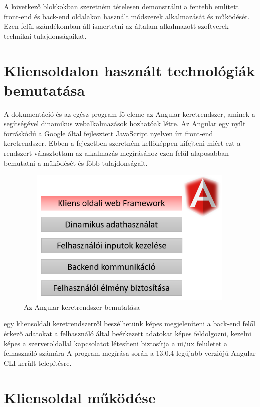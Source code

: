 \bigskip
A következő blokkokban szeretném tételesen demonstrálni a fentebb említett front-end és back-end oldalakon használt módszerek alkalmazását és működését. Ezen felül szándékomban áll ismertetni az általam alkalmazott szoftverek technikai tulajdonságaikat.

\section{Kliensoldalon használt technológiák bemutatása}
A dokumentáció és az egész program fő eleme az Angular keretrendszer, aminek a segítségével dinamikus webalkalmazások hozhatóak létre. Az Angular egy nyílt forráskódú a Google által fejlesztett JavaScript nyelven írt front-end keretrendszer. Ebben a fejezetben szeretném kellőképpen kifejteni miért ezt a rendszert választottam az alkalmazás megírásához ezen felül alaposabban bemutatni a működését és főbb tulajdonságait. 

\begin{figure}[H]
	\centering
	\includegraphics[width=1.0\textwidth,height=250px]{images/angular_bemutatas.png}
	\caption{Az Angular keretrendszer bemutatása}
	\label{fig.picture-2}
\end{figure}

 egy kliensoldali keretrendszerről beszélhetünk
 képes megjeleníteni a back-end felől érkező adatokat
 a felhasználó által beérkezett adatokat képes feldolgozni, kezelni
 képes a szerveroldallal kapcsolatot létesíteni
 biztosítja a ui/ux feluletet a felhasználó számára
A program megírása során a 13.0.4 legújabb verziójú Angular CLI került telepítésre.

\section{Kliensoldal működése}

